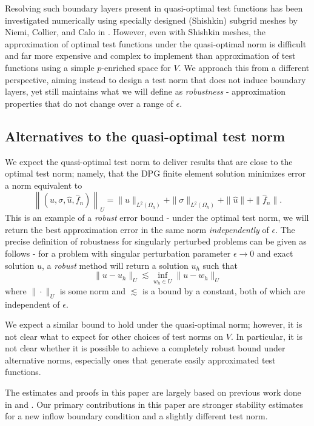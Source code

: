 \documentclass[11pt,onecolumn]{scrartcl}
\begin{document}
Resolving such boundary layers present in quasi-optimal test functions
has been investigated numerically using specially designed (Shishkin)
subgrid meshes by Niemi, Collier, and Calo in
\cite{DBLP:journals/procedia/NiemiCC11}.  However, even with Shishkin
meshes, the approximation of optimal test functions under the
quasi-optimal norm is difficult and far more expensive and complex to
implement than approximation of test functions using a simple
$p$-enriched space for $V$. We approach this from a different
perspective, aiming instead to design a test norm that does not induce boundary layers, yet still maintains what we will define as \textit{robustness} - approximation properties that do not change over a range of $\epsilon$.  

\subsection{Alternatives to the quasi-optimal test norm}

We expect the quasi-optimal test norm to deliver results that are close to the optimal test norm; namely, that the DPG finite element solution minimizes error a norm equivalent to
\[
\left\|\left(u,\sigma,\widehat{u},\widehat{f}_n\right)\right\|_U = \|u\|_{L^2(\Omega_h)} + \|\sigma\|_{L^2(\Omega_h)} +
\|\widehat{u}\| + \|\widehat{f}_n\|.
\]
This is an example of a \textit{robust} error bound - under the optimal test norm, we will return the best approximation error in the same norm \textit{independently} of $\epsilon$.  The precise definition of robustness for singularly perturbed problems can be given as follows - for a problem with singular perturbation parameter $\epsilon\rightarrow 0$ and exact solution $u$, a \textit{robust} method will return a solution $u_h$ such that
\[
\|u-u_h\|_U \lesssim  \inf_{w_h\in U}\|u-w_h\|_U
\]
where $\|\cdot \|_U$ is some norm and $\lesssim$ is a bound by a constant, both of which are independent of  $\epsilon$.  

We expect a similar bound to hold under the quasi-optimal norm; however, it is not clear what to expect for other choices of test norms on $V$.  In particular, it is not clear whether it is possible to achieve a completely robust bound under alternative norms, especially ones that generate easily approximated test functions.  

The estimates and proofs in this paper are largely based on previous
work done in \cite{DPGrobustness} and \cite{analysisDPG}. Our primary
contributions in this paper are stronger stability estimates for a new
inflow boundary condition and a slightly different test norm.
\end{document}

